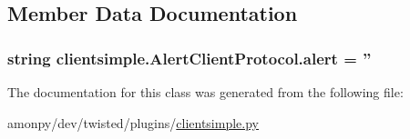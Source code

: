 \subsection{Member Data Documentation}
\hypertarget{classclientsimple_1_1_alert_client_protocol_aa51562cefc509b7022e1d23e0106dc5f}{
\subsubsection[{alert}]{\setlength{\rightskip}{0pt plus 5cm}string clientsimple.\-Alert\-Client\-Protocol.\-alert = ''\hspace{0.3cm}{\ttfamily [static]}}}\label{classclientsimple_1_1_alert_client_protocol_aa51562cefc509b7022e1d23e0106dc5f}


The documentation for this class was generated from the following file\-:\begin{DoxyCompactItemize}
\item 
amonpy/dev/twisted/plugins/\hyperlink{clientsimple_8py}{clientsimple.\-py}\end{DoxyCompactItemize}
